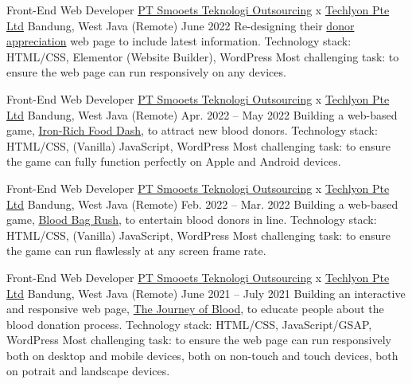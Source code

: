 \begin{cventries}
\cventry
{Front-End Web Developer} %
{\href{https://www.smooets.com/}{PT Smooets Teknologi Outsourcing} x \href{https://helloakin.com/}{Techlyon Pte Ltd}} %
{Bandung, West Java (Remote)} %
{June 2022} %
{ %
Re-designing their \href{https://giveblood.sg/donor-appreciation/}{donor appreciation} web page to include latest information.
\linebreak
Technology stack: HTML/CSS, Elementor (Website Builder), WordPress
\linebreak
Most challenging task: to ensure the web page can run responsively on any devices.
}

\cventry
{Front-End Web Developer} %
{\href{https://www.smooets.com/}{PT Smooets Teknologi Outsourcing} x \href{https://helloakin.com/}{Techlyon Pte Ltd}} %
{Bandung, West Java (Remote)} %
{Apr. 2022 -- May 2022} %
{ %
Building a web-based game, \href{https://giveblood.sg/iron-rich-food/}{Iron-Rich Food Dash}, to attract new blood donors.
\linebreak
Technology stack: HTML/CSS, (Vanilla) JavaScript, WordPress
\linebreak
Most challenging task: to ensure the game can fully function perfectly on Apple and Android devices.
}

\cventry
{Front-End Web Developer} %
{\href{https://www.smooets.com/}{PT Smooets Teknologi Outsourcing} x \href{https://helloakin.com/}{Techlyon Pte Ltd}} %
{Bandung, West Java (Remote)} %
{Feb. 2022 -- Mar. 2022} %
{ %
Building a web-based game, \href{https://giveblood.sg/blood-bag-rush/}{Blood Bag Rush}, to entertain blood donors in line.
\linebreak
Technology stack: HTML/CSS, (Vanilla) JavaScript, WordPress
\linebreak
Most challenging task: to ensure the game can run flawlessly at any screen frame rate.
}

\cventry
{Front-End Web Developer} %
{\href{https://www.smooets.com/}{PT Smooets Teknologi Outsourcing} x \href{https://helloakin.com/}{Techlyon Pte Ltd}} %
{Bandung, West Java (Remote)} %
{June 2021 -- July 2021} %
{ %
Building an interactive and responsive web page, \href{https://giveblood.sg/discover/}{The Journey of Blood}, to educate people about the blood donation process.
\linebreak
Technology stack: HTML/CSS, JavaScript/GSAP, WordPress
\linebreak
Most challenging task: to ensure the web page can run responsively both on desktop and mobile devices, both on non-touch and touch devices, both on potrait and landscape devices.
}


\end{cventries}
